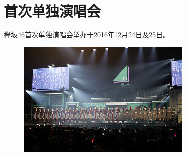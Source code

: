 ﻿
\chapter{首次单独演唱会}

欅坂46首次单独演唱会举办于2016年12月24日及25日。

\begin{figure}[htp]
  \centering
  {\includegraphics[width=85mm]{images/sp-1/1.jpg}}
\end{figure}

\thispagestyle{empty} %
\clearpage





       \clearpage

